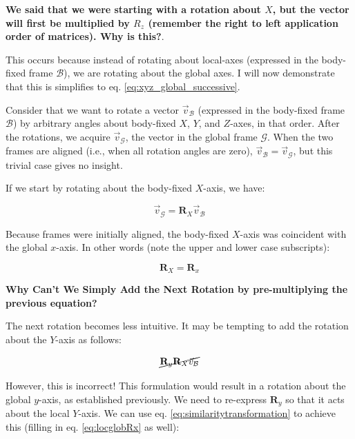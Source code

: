 \documentclass{article}
\begin{document}
\textbf{We said that we were starting with a rotation about \(X \), but the vector will first be multiplied by \(R_z\) (remember the right to left application order of matrices). Why is this?}. 

This occurs because instead of rotating about local-axes (expressed in the body-fixed frame \( \mathcal{B} \)), we are rotating about the global axes. I will now demonstrate that this is simplifies to eq. \ref{eq:xyz_global_successive}.


Consider that we want to rotate a vector \( \vec{v}_{\mathcal{B}} \) (expressed in the body-fixed frame \( \mathcal{B} \)) by arbitrary angles about body-fixed \( X\), \(Y\), and \(Z\)-axes, in that order. After the rotations, we acquire \( \vec{v}_{\mathcal{G}} \), the vector in the global frame \( \mathcal{G} \). 
When the two frames are aligned (i.e., when all rotation angles are zero), \( \vec{v}_{\mathcal{B}} = \vec{v}_{\mathcal{G}} \), but this trivial case gives no insight.

If we start by rotating about the body-fixed \(X\)-axis, we have:

\begin{equation}
\vec{v}_{\mathcal{G}} = \mathbf{R}_X \vec{v}_{\mathcal{B}}
\end{equation}

Because frames were initially aligned, the body-fixed \( X\)-axis was coincident with the global \( x\)-axis. In other words (note the upper and lower case subscripts):

\begin{equation}
    \mathbf{R}_X = \mathbf{R}_x
    \label{eq:locglobRx}
\end{equation}
    

\textbf{Why Can't We Simply Add the Next Rotation by pre-multiplying the previous equation?}

The next rotation becomes less intuitive. It may be tempting to add the rotation about the \(Y\)-axis as follows:

\begin{equation}
    \cancel{\mathbf{R}_y \mathbf{R}_X \vec{v}_{\mathcal{B}}}
\end{equation}

However, this is incorrect! This formulation would result in a rotation about the global \( y\)-axis, as established previously. We need to re-express \( \mathbf{R}_y \) so that it acts about the local \(Y\)-axis. We can use eq. \ref{eq:similaritytransformation} to achieve this (filling in eq. \ref{eq:locglobRx} as well):
\end{document}
